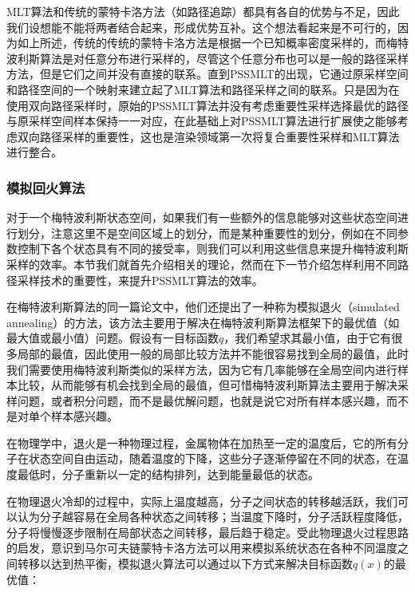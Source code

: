 MLT算法和传统的蒙特卡洛方法（如路径追踪）都具有各自的优势与不足，因此我们设想能不能将两者结合起来，形成优势互补。这个想法看起来是不可行的，因为如上所述，传统的传统的蒙特卡洛方法是根据一个已知概率密度采样的，而梅特波利斯算法是对任意分布进行采样的，尽管这个任意分布也可以是一般的路径采样方法，但是它们之间并没有直接的联系。直到PSSMLT的出现，它通过原采样空间和路径空间的一个映射来建立起了MLT算法和路径采样之间的联系。只是因为在使用双向路径采样时，原始的PSSMLT算法并没有考虑重要性采样选择最优的路径与原采样空间样本保持一一对应，\cite{a:MultiplexedMetropolisLightTransport}在此基础上对PSSMLT算法进行扩展使之能够考虑双向路径采样的重要性，这也是渲染领域第一次将复合重要性采样和MLT算法进行整合。




\subsubsection{模拟回火算法}\label{sec:mlt-simulated-tempering}
对于一个梅特波利斯状态空间，如果我们有一些额外的信息能够对这些状态空间进行划分，注意这里不是空间区域上的划分，而是某种重要性的划分，例如在不同参数控制下各个状态具有不同的接受率，则我们可以利用这些信息来提升梅特波利斯采样的效率。本节我们就首先介绍相关的理论，然而在下一节介绍怎样利用不同路径采样技术的重要性，来提升PSSMLT算法的效率。

在梅特波利斯算法\cite{a:EquationofStateCalculationsbyFastComputingMachines}的同一篇论文中，他们还提出了一种称为模拟退火（simulated annealing）的方法，该方法主要用于解决在梅特波利斯算法框架下的最优值（如最大值或最小值）问题。假设有一目标函数$q$，我们希望求其最小值，由于它有很多局部的最值，因此使用一般的局部比较方法并不能很容易找到全局的最值，此时我们需要使用梅特波利斯类似的采样方法，因为它有几率能够在全局空间内进行样本比较，从而能够有机会找到全局的最值，但可惜梅特波利斯算法主要用于解决采样问题，或者积分问题，而不是最优解问题，也就是说它对所有样本感兴趣，而不是对单个样本感兴趣。

在物理学中，退火是一种物理过程，金属物体在加热至一定的温度后，它的所有分子在状态空间自由运动，随着温度的下降，这些分子逐渐停留在不同的状态，在温度最低时，分子重新以一定的结构排列，达到能量最低的状态。

在物理退火冷却的过程中，实际上温度越高，分子之间状态的转移越活跃，我们可以认为分子越容易在全局各种状态之间转移；当温度下降时，分子活跃程度降低，分子将慢慢逐步限制在局部状态之间转移，最后趋于稳定。受此物理退火过程思路的启发，意识到马尔可夫链蒙特卡洛方法可以用来模拟系统状态在各种不同温度之间转移以达到热平衡，模拟退火算法可以通过以下方式来解决目标函数$q(x)$的最优值：

